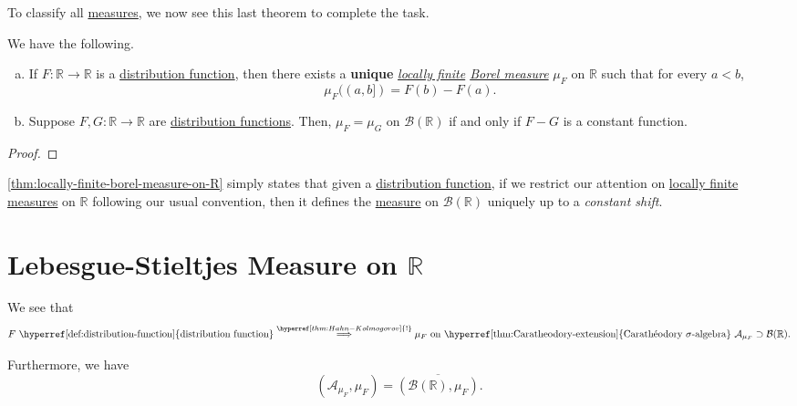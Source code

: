 To classify all \hyperref[def:measure]{measures}, we now see this last theorem to complete the task.

\begin{theorem}\label{thm:locally-finite-borel-measure-on-R}
	We have the following.
	\begin{enumerate}[(a)]
		\item If \(F\colon \mathbb{R} \to \mathbb{R} \) is a \hyperref[def:distribution-function]{distribution function}, then there exists a \textbf{unique} \emph{\hyperref[def:locally-finite]{locally finite} \hyperref[def:Borel-measure]{Borel measure}} \(\mu _F\) on \(\mathbb{R} \) such that for every \(a < b\),
		      \[
			      \mu _F((a, b]) = F(b) - F(a).
		      \]
		\item Suppose \(F, G\colon \mathbb{R} \to \mathbb{R} \) are \hyperref[def:distribution-function]{distribution functions}. Then, \(\mu _F = \mu _G\) on \(\mathcal{B} (\mathbb{R} )\) if and only if \(F-G\) is a constant function.
	\end{enumerate}
\end{theorem}
\begin{proof}
\end{proof}

\begin{remark}
	\autoref{thm:locally-finite-borel-measure-on-R} simply states that given a \hyperref[def:distribution-function]{distribution function}, if we restrict our attention on \hyperref[def:locally-finite]{locally finite} \hyperref[def:measure]{measures} on \(\mathbb{R} \) following our usual convention, then it defines the \hyperref[def:measure]{measure} on \(\mathcal{B}(\mathbb{R} )\) uniquely up to a \emph{constant shift}.
\end{remark}

\section{Lebesgue-Stieltjes Measure on \(\mathbb{R}\)}
We see that
\[
	F \text{ \hyperref[def:distribution-function]{distribution function}}
	\overset{\hyperref[thm:Hahn-Kolmogorov]{!}}{\implies }
	\mu _F \text{ on \hyperref[thm:Caratheodory-extension]{Carathéodory \(\sigma\)-algebra}}\ \mathcal{A}_{\mu _F}\supset \mathcal{B} (\mathbb{R}) .
\]

Furthermore, we have
\[
	(\mathcal{A}_{\mu _F}, \mu _F) = \overline{(\mathcal{B} (\mathbb{R} ), \mu _F)}.
\]

